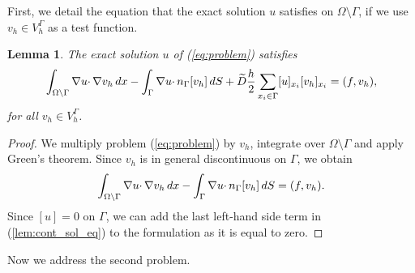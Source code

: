 \documentclass{article}
\newtheorem{lemma}{Lemma}
\theoremstyle{remark}
\def \d {{\rm d}}
\def\dx{\,\d x }
\def\dS{\,\d S }
\def\tD{\widetilde{D}}
\begin{document}
First, we detail the equation that the exact solution $u$ satisfies on $\Omega\setminus\Gamma$, if we use $v_h\in V_h^\Gamma$ as a test function.

\begin{lemma}
\label{lem:cont_sol}
The exact solution $u$ of (\ref{eq:problem}) satisfies
\begin{equation}
\label{lem:cont_sol_eq}
\int_{\Omega\setminus\Gamma}\nabla u\cdotp\nabla v_h \dx -\int_\Gamma\nabla u\cdotp n_\Gamma[v_h]\dS +\tD\frac{h}{2}\sum_{x_i\in\Gamma}[u]_{x_i}[v_h]_{x_i} =(f,v_h),
\end{equation}
for all $v_h\in V_h^\Gamma$.
\end{lemma}
\begin{proof}
We multiply problem (\ref{eq:problem}) by $v_h$, integrate over $\Omega\setminus\Gamma$ and apply Green's theorem. Since $v_h$ is in general discontinuous on $\Gamma$, we obtain
\begin{equation}
\int_{\Omega\setminus\Gamma}\nabla u\cdotp\nabla v_h \dx -\int_\Gamma\nabla u\cdotp n_\Gamma[v_h]\dS =(f,v_h).
\end{equation}
Since $[u]=0$ on $\Gamma$, we can add the last left-hand side term in (\ref{lem:cont_sol_eq}) to the formulation as it is equal to zero.
\end{proof}

Now we address the second problem.
\end{document}
